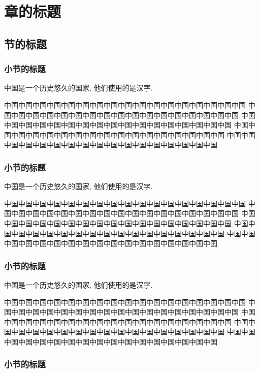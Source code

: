 \chapter{章的标题}

\section{节的标题}

\subsection{小节的标题}

中国是一个历史悠久的国家, 他们使用的是汉字.

中国中国中国中国中国中国中国中国中国中国中国中国中国中国中国中国中国
中国中国中国中国中国中国中国中国中国中国中国中国中国中国中国中国中国
中国中国中国中国中国中国中国中国中国中国中国中国中国中国中国中国中国
中国中国中国中国中国中国中国中国中国中国中国中国中国中国中国中国中国
中国中国中国中国中国中国中国中国中国中国中国中国中国中国中国中国中国

\subsection{小节的标题}

中国是一个历史悠久的国家, 他们使用的是汉字.

中国中国中国中国中国中国中国中国中国中国中国中国中国中国中国中国中国
中国中国中国中国中国中国中国中国中国中国中国中国中国中国中国中国中国
中国中国中国中国中国中国中国中国中国中国中国中国中国中国中国中国中国
中国中国中国中国中国中国中国中国中国中国中国中国中国中国中国中国中国
中国中国中国中国中国中国中国中国中国中国中国中国中国中国中国中国中国

\subsection{小节的标题}

中国是一个历史悠久的国家, 他们使用的是汉字.

中国中国中国中国中国中国中国中国中国中国中国中国中国中国中国中国中国
中国中国中国中国中国中国中国中国中国中国中国中国中国中国中国中国中国
中国中国中国中国中国中国中国中国中国中国中国中国中国中国中国中国中国
中国中国中国中国中国中国中国中国中国中国中国中国中国中国中国中国中国
中国中国中国中国中国中国中国中国中国中国中国中国中国中国中国中国中国

\subsection{小节的标题}

